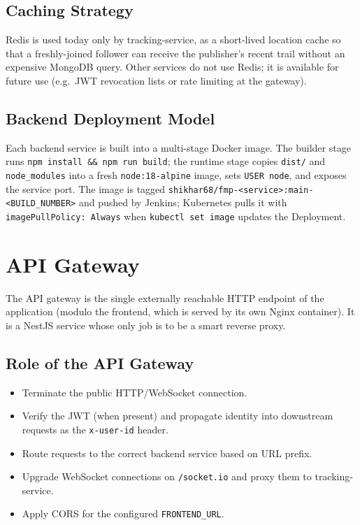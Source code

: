 \documentclass[11pt,a4paper]{article}
\begin{document}
\subsection{Caching Strategy}
Redis is used today only by tracking-service, as a short-lived
location cache so that a freshly-joined follower can receive the
publisher's recent trail without an expensive MongoDB query.  Other
services do not use Redis; it is available for future use (e.g.\ JWT
revocation lists or rate limiting at the gateway).

\subsection{Backend Deployment Model}
Each backend service is built into a multi-stage Docker image.  The
builder stage runs \texttt{npm install \&\& npm run build}; the
runtime stage copies \texttt{dist/} and \texttt{node\_modules} into a
fresh \texttt{node:18-alpine} image, sets \texttt{USER node}, and
exposes the service port.  The image is tagged
\texttt{shikhar68/fmp-<service>:main-<BUILD\_NUMBER>} and pushed by
Jenkins; Kubernetes pulls it with \texttt{imagePullPolicy: Always}
when \texttt{kubectl set image} updates the Deployment.

\section{API Gateway}

The API gateway is the single externally reachable HTTP endpoint of
the application (modulo the frontend, which is served by its own Nginx
container).  It is a NestJS service whose only job is to be a smart
reverse proxy.

\subsection{Role of the API Gateway}
\begin{itemize}[leftmargin=*]
  \item Terminate the public HTTP/WebSocket connection.
  \item Verify the JWT (when present) and propagate identity into
        downstream requests as the \texttt{x-user-id} header.
  \item Route requests to the correct backend service based on URL
        prefix.
  \item Upgrade WebSocket connections on \texttt{/socket.io} and
        proxy them to tracking-service.
  \item Apply CORS for the configured \texttt{FRONTEND\_URL}.
\end{itemize}
\end{document}
